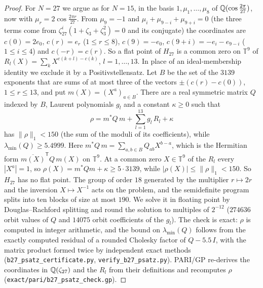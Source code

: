 \begin{proof}
For $N=27$ we argue as for $N=15$, in the basis $1,\mu_1,\dots,\mu_8$ of $\mathbb{Q}(\cos\frac{2\pi}{27})$, now with
$\mu_r=2\cos\frac{2\pi r}{27}$. From $\mu_9=-1$ and $\mu_i+\mu_{9-i}+\mu_{9+i}=0$ (the three terms come from
$\zeta_{27}^i(1+\zeta_3+\zeta_3^2)=0$ and its conjugate) the coordinates are $c(0)=2e_0$, $c(r)=e_r$
($1\le r\le8$), $c(9)=-e_0$, $c(9+i)=-e_i-e_{9-i}$ ($1\le i\le4$) and $c(-r)=c(r)$. So a flat point of $H_{27}$ is a
common zero on $\mathbb T^9$ of $R_l(X)=\sum_kX^{c(k+l)-c(k)}$, $l=1,\dots,13$. In place of an ideal-membership
identity we exclude it by a Positivstellensatz. Let $B$ be the set of the $3139$ exponents that are sums of at most
three of the vectors $\pm(c(r)-c(0))$, $1\le r\le13$, and put $m(X)=(X^a)_{a\in B}$. There are a real symmetric
matrix $Q$ indexed by $B$, Laurent polynomials $g_l$ and a constant $\kappa\ge0$ such that
\[
  \rho=m^*Q\,m+\sum_{l=1}^{13}g_l\,R_l+\kappa
\]
has $\|\rho\|_1<150$ (the sum of the moduli of its coefficients), while $\lambda_{\min}(Q)\ge5.4999$. Here
$m^*Q\,m=\sum_{a,b\in B}Q_{ab}X^{b-a}$, which is the Hermitian form $\overline{m(X)}^{\mathsf T}Q\,m(X)$ on $\mathbb T^9$. At a
common zero $X\in\mathbb T^9$ of the $R_l$ every $|X^a|=1$, so $\rho(X)=m^*Qm+\kappa\ge5\cdot3139$, while
$|\rho(X)|\le\|\rho\|_1<150$. So $H_{27}$ has no flat point. The group of order $18$ generated by the multiplier
$r\mapsto2r$ and the inversion $X\mapsto X^{-1}$ acts on the problem, and the semidefinite program splits into ten
blocks of size at most $190$. We solve it in floating point by Douglas--Rachford splitting and round the solution
to multiples of $2^{-12}$ ($274636$ orbit values of $Q$ and $14075$ orbit coefficients of the $g_l$). The check is
exact: $\rho$ is computed in integer arithmetic, and the bound on $\lambda_{\min}(Q)$ follows from the exactly
computed residual of a rounded Cholesky factor of $Q-5.5\,I$, with the matrix product formed twice by independent
exact methods (\texttt{b27\_psatz\_certificate.py}, \texttt{verify\_b27\_psatz.py}). \textsc{PARI/GP} re-derives the
coordinates in $\mathbb{Q}(\zeta_{27})$ and the $R_l$ from their definitions and recomputes $\rho$
(\texttt{exact/pari/b27\_psatz\_check.gp}).
\end{proof}

